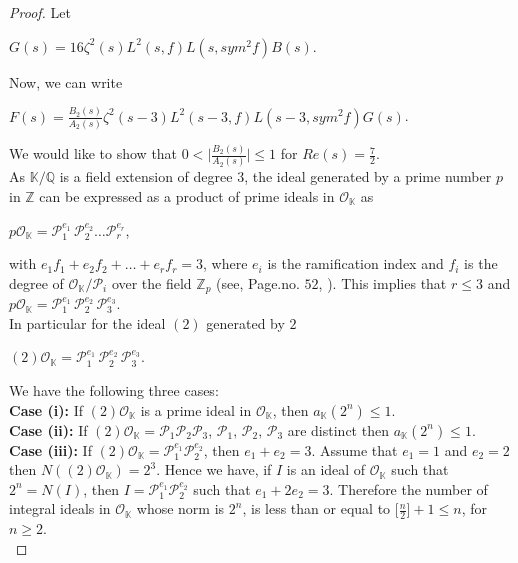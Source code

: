 \documentclass[preprint,12pt]{elsarticle}
\numberwithin{equation}{section}
\begin{document}
\begin{proof}
	\newpage
	\noindent Let
	\begin{center}
		$G(s)=16\zeta^{2}(s)L^{2}(s,f)L(s,sym^{2}f)B(s)$.
	\end{center}
	Now, we can write\\
	\begin{center}
		$F(s)=\frac{B_{2}(s)}{A_{2}(s)}\zeta^{2}(s-3)L^{2}(s-3,f)L(s-3,sym^{2}f)G(s)$.
	\end{center}
	We would like to show that $0<\Big|\frac{B_{2}(s)}{A_{2}(s)}\Big|\leq 1$ for $Re(s) =\frac{7}{2}$.\\
	As $\mathbb{K}/\mathbb{Q}$ is a field extension of degree $3$, the ideal generated by a prime number $p$ in $\mathbb{Z}$ can be expressed as a product of prime ideals in $\mathcal{O}_{\mathbb{K}}$ as
	\begin{center}
		$p\mathcal{O}_{\mathbb{K}}=\mathcal{P}_{1}^{e_{1}}\,\mathcal{P}_{2}^{e_{2}}\dots\mathcal{P}_{r}^{e_{r}}$,
	\end{center}
	with $e_{1}f_{1}+e_{2}f_{2}+\dots+e_{r}f_{r}=3$, where $e_{i}$ is the ramification index and $f_{i}$ is the degree of $\mathcal{O}_{\mathbb{K}}/\mathcal{P}_{i}$ over the field $\mathbb{Z}_{p}$ (see, Page.no. $52$, \cite{milne}). This implies that $r\leq 3$ and $p\mathcal{O}_{\mathbb{K}}=\mathcal{P}_{1}^{e_{1}}\,\mathcal{P}_{2}^{e_{2}}\,\mathcal{P}_{3}^{e_{3}}$.\\
	In particular for the ideal $(2)$ generated by $2$
	\begin{center}
		$(2)\mathcal{O}_{\mathbb{K}}=\mathcal{P}_{1}^{e_{1}}\,\mathcal{P}_{2}^{e_{2}}\,\mathcal{P}_{3}^{e_{3}}$.
	\end{center}
	We have the following three cases:\\
	\textbf{Case (i):} If $(2)\mathcal{O}_{\mathbb{K}}$ is a prime ideal in $\mathcal{O}_{\mathbb{K}}$, then $a_{\mathbb{K}}(2^{n})\leq1$.\\
	
	\noindent\textbf{Case (ii):} If $(2)\mathcal{O}_{\mathbb{K}}=\mathcal{P}_{1}\mathcal{P}_{2}\mathcal{P}_{3}$, $\mathcal{P}_{1},\,\mathcal{P}_{2},\,\mathcal{P}_{3}$ are distinct then $a_{\mathbb{K}}(2^{n})\leq 1$.\\
	
	\noindent\textbf{Case (iii):} If $(2)\mathcal{O}_{\mathbb{K}}=\mathcal{P}_{1}^{e_{1}}\mathcal{P}_{2}^{e_{2}}$, then $e_{1}+e_{2}=3$. Assume that $e_{1}=1$ and $e_{2}=2$ then $N((2)\mathcal{O}_{\mathbb{K}})=2^{3}$. Hence we have, if    $I$ is an ideal of $\mathcal{O}_{\mathbb{K}}$ such that $2^{n}=N(I)$, then  $I=\mathcal{P}_{1}^{e_{1}}\mathcal{P}_{2}^{e_{2}}$ such that $e_{1}+2e_{2}=3$. Therefore the number of integral ideals in $\mathcal{O}_{\mathbb{K}}$ whose norm is $2^{n}$, is less than or equal to $\Big[\frac{n}{2}\Big]+1\leq n$, for $n\geq 2.$\\
	

\end{proof}
\end{document}
